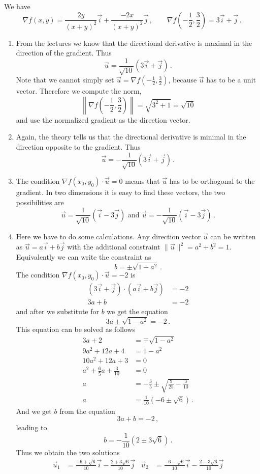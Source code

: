 \begin{solution}
We have
\[
\nabla f(x,y) = \frac{2y}{(x+y)^2}\vec i + \frac{-2x}{(x+y)^2} \vec j\,,
\qquad
\nabla f\left( -\frac 12, \frac 32\right) = 3 \vec i + \vec j\,.
\]

\begin{enumerate}
\item
From the lectures we know that the directional derivative is maximal in the direction of the gradient. Thus
\[
\vec u = \frac{1}{\sqrt{10}}\left( 3 \vec i + \vec j \right)\,.
\]
Note that we cannot simply set $\vec u = \nabla f\left(-\frac12, \frac 32\right)$, because $\vec u$ has to be a unit vector. Therefore we compute the norm,
\[ \left\| \nabla f\left( -\frac 12, \frac 32\right) \right\|= \sqrt{3^2 + 1} = \sqrt{10} \]
and use the normalized gradient as the direction vector.
\item
Again, the theory tells us that the directional derivative is minimal in the direction opposite to the gradient. Thus
\[
\vec u = -\frac{1}{\sqrt{10}}\left( 3 \vec i + \vec j \right)\,.
\]
\item
The condition $\nabla f(x_0,y_0) \cdot \vec u = 0$ means that $\vec u$ has to be orthogonal to the gradient. In two dimensions it is easy to find these vectors, the two possibilities are
\[
\vec u = \frac{1}{\sqrt{10}}\left( \vec i -3 \vec j \right)\text{ and }
\vec u = -\frac{1}{\sqrt{10}} \left( \vec i -3\vec j \right)\,.
\]
\item
Here we have to do some calculations. Any direction vector $\vec u$ can be written as $\vec u = a\vec i + b\vec j$ with the additional constraint $\| \vec u\|^2 = a^2+b^2 = 1$. Equivalently we can write the constraint as
\[
b = \pm \sqrt{1-a^2}\,.
\]
The condition $\nabla f(x_0,y_0) \cdot \vec u = -2$ is
\begin{align*}
(3\vec i + \vec j) \cdot (a \vec i + b \vec j) &= -2 \\
3a + b &= -2
\end{align*}
and after we substitute for $b$ we get the equation
\[
3a \pm \sqrt{1-a^2} = -2\,.
\]
This equation can be solved as follows
\begin{align*}
3a + 2 &= \mp \sqrt{1-a^2} \\
9a^2 + 12a + 4 &= 1-a^2 \\
10a^2 + 12a + 3 &= 0 \\
a^2 + \frac 65 a + \frac 3{10} &= 0 \\
a &= -\frac 35 \pm \sqrt{ \frac{9}{25} - \frac{3}{10}} \\
a &= \frac{1}{10}\left(-6 \pm \sqrt{6}\right)\,.
\end{align*}
And we get $b$ from the equation
\[
3a + b = -2\,,
\]
leading to
\[
b = -\frac{1}{10} \left( 2 \pm 3 \sqrt{6}\right)\,.
\]
Thus we obtain the two solutions
\begin{align*}
\vec u_1 &= \frac{-6 + \sqrt 6}{10} \vec i - \frac{2 + 3\sqrt 6}{10} \vec j &
\vec u_2 &= \frac{-6 - \sqrt 6}{10} \vec i - \frac{2 - 3\sqrt 6}{10} \vec j
\end{align*}


\end{enumerate}
\end{solution}

